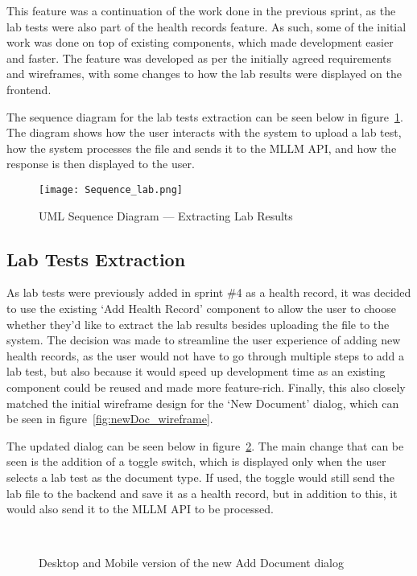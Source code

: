 This feature was a continuation of the work done in the previous sprint, as the lab tests were also part of the health records feature. As such, some of the initial work was done on top of existing components, which made development easier and faster. The feature was developed as per the initially agreed requirements and wireframes, with some changes to how the lab results were displayed on the frontend.

The sequence diagram for the lab tests extraction can be seen below in figure~\ref{fig:sequence_lab}. The diagram shows how the user interacts with the system to upload a lab test, how the system processes the file and sends it to the MLLM API, and how the response is then displayed to the user.

\begin{figure}[htbp]
  \centering
  \texttt{[image: Sequence\_lab.png]}
  \caption{UML Sequence Diagram --- Extracting Lab Results}\label{fig:sequence_lab}
\end{figure}

\subsection{Lab Tests Extraction}

As lab tests were previously added in sprint \#4 as a health record, it was decided to use the existing `Add Health Record' component to allow the user to choose whether they'd like to extract the lab results besides uploading the file to the system. The decision was made to streamline the user experience of adding new health records, as the user would not have to go through multiple steps to add a lab test, but also because it would speed up development time as an existing component could be reused and made more feature-rich. Finally, this also closely matched the initial wireframe design for the `New Document' dialog, which can be seen in figure~\ref{fig:newDoc_wireframe}.

The updated dialog can be seen below in figure~\ref{fig:labs_addDoc}. The main change that can be seen is the addition of a toggle switch, which is displayed only when the user selects a lab test as the document type. If used, the toggle would still send the lab file to the backend and save it as a health record, but in addition to this, it would also send it to the MLLM API to be processed. 

\begin{figure}[ht]
  \centering
  \\[\baselineskip]
  \caption{Desktop and Mobile version of the new Add Document dialog}\label{fig:labs_addDoc}
\end{figure}

